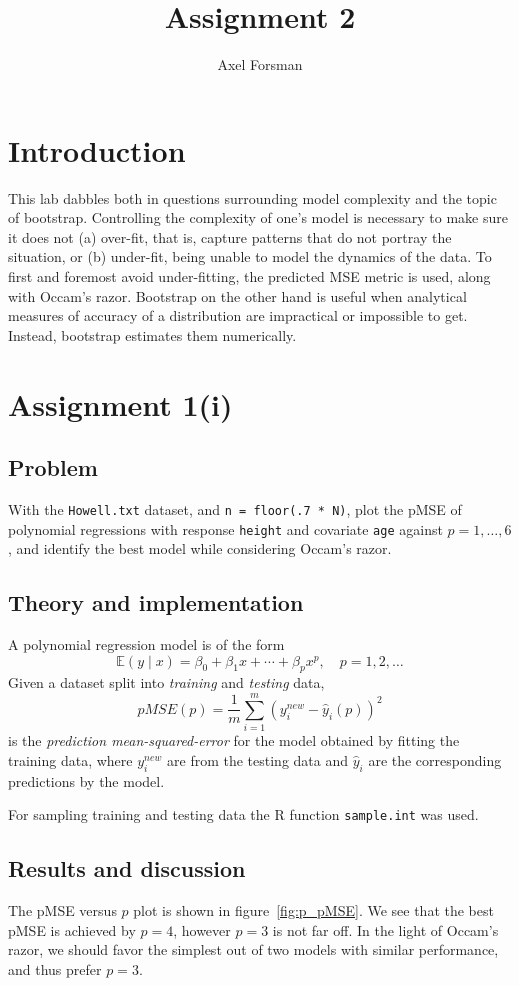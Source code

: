 \documentclass[11pt, a4paper]{article}
\title{Assignment 2}
\author{Axel Forsman}
\begin{document}
\maketitle

\section{Introduction}
This lab dabbles both in questions surrounding model complexity and the topic of bootstrap.
Controlling the complexity of one's model is necessary to make sure it does not
(a) over-fit, that is, capture patterns that do not portray the situation, or
(b) under-fit, being unable to model the dynamics of the data.
To first and foremost avoid under-fitting, the predicted MSE metric is used,
along with Occam's razor.
Bootstrap on the other hand is useful when analytical measures of accuracy of a distribution
are impractical or impossible to get.
Instead, bootstrap estimates them numerically.

\section{Assignment 1(i)}
\subsection{Problem}
With the \verb|Howell.txt| dataset, and \verb|n = floor(.7 * N)|,
plot the pMSE of polynomial regressions with response \texttt{height} and covariate \texttt{age}
against $p = 1, \ldots, 6$,
and identify the best model while considering Occam's razor.

\subsection{Theory and implementation}
A polynomial regression model is of the form
$$ \mathbb E(y \mid x) = \beta_0 + \beta_1 x + \cdots + \beta_p x^p, \quad p = 1, 2, \ldots $$
Given a dataset split into \emph{training} and \emph{testing} data,
$$ pMSE(p) = \frac1m \sum^m_{i=1} \left(y_i^{new} - \hat y_i(p)\right)^2$$
is the \emph{prediction mean-squared-error} for the model
obtained by fitting the training data,
where $y_i^{new}$ are from the testing data and
$\hat y_i$ are the corresponding predictions by the model.

For sampling training and testing data the R function \texttt{sample.int} was used.

\subsection{Results and discussion}
The pMSE versus $p$ plot is shown in figure~\ref{fig:p_pMSE}.
We see that the best pMSE is achieved by $p=4$, however $p=3$ is not far off.
In the light of Occam's razor,
we should favor the simplest out of two models with similar performance,
and thus prefer $p=3$.
\end{document}
